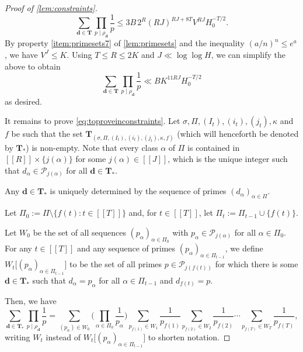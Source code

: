 \documentclass[11pt]{amsart}
\theoremstyle{definition}
\renewcommand{\leq}{\leqslant}
\newcommand{\sinterval}[1]{[\![#1]\!] }
\newcommand{\primes}{\mathcal{P}}
\renewcommand{\d}{\boldsymbol{d}}
\newcommand{\curlyL}{V}
\newcommand{\fprod}[1]{\rho_{#1}}
\newcommand{\pall}{\fprod{\d}}
\newcommand{\solpartial}{W}
\newcommand{\XX}{\mathbf{T}}
\newcommand{\repR}{J}
\newcommand{\repK}{K}
\newcommand{\newR}{\sinterval{J}}
\newcommand{\tupsize}{R}
\newcommand{\ncond}{T}
\newcommand{\cshift}{\kappa}
\newcommand{\somesigns}{\sigma}
\begin{document}
\begin{proof}[Proof of \cref{lem:constraints}]
\begin{equation*}
	\sum_{\d\in \XX} \prod_{p\mid \pall} \frac1p \leq 3B \, 2^{\tupsize} (\tupsize \repR)^{\tupsize \repR+8\ncond} \curlyL^{\tupsize \repR} H_0^{-\ncond/2}.
\end{equation*}
By property \cref{item:primesets7} of \cref{lem:primesets} and the inequality $(a/n)^n\leq e^a$, we have $\curlyL^{\repR} \leq \repK$. Using $\ncond \leq \tupsize \leq 2\repK$ and $\repR \ll \log\log H$, we can simplify the above to obtain
\begin{equation*}
	\sum_{\d\in \XX} \prod_{p\mid \pall} \frac1p \ll B \repK^{11\tupsize \repR} H_0^{-\ncond/2}
\end{equation*}
as desired.

It remains to prove \cref{eq:toproveinconstraints}. Let $\somesigns,\Pi, (I_t),(i_t),(j_t),\cshift$ and $f$ be such that the set $\XX_{(\somesigns,\Pi, (I_t),(i_t),(j_t),\cshift,f)}$ (which will henceforth be denoted by $\XX_*$) is non-empty. Note that every class $\alpha$ of $\Pi$ is contained in $\sinterval{\tupsize} \!\times\!  \{j(\alpha)\}$ for some $j(\alpha)\in \newR$, which is the unique integer such that $d_{\alpha} \in \primes_{\!j(\alpha)}$ for all $\d \in \XX_*$.

Any $\d \in\XX_*$ is uniquely determined by the sequence of primes $(d_{\alpha})_{\alpha\in \Pi}$. 

Let $\Pi_0 := \Pi\setminus \{f(t) : t\in \sinterval{\ncond}\}$ and, for $t\in \sinterval{\ncond}$, let $\Pi_t := \Pi_{t-1} \cup \{f(t)\}$. 

Let $\solpartial_0$ be the set of all sequences $(p_{\alpha})_{\alpha\in \Pi_0}$ with $p_{\alpha}\in \primes_{\!j(\alpha)}$ for all $\alpha\in \Pi_0$. For any $t\in \sinterval{\ncond}$ and any sequence of primes $(p_{\alpha})_{\alpha\in \Pi_{t-1}}$, we define $\solpartial_t\big[ (p_{\alpha})_{\alpha\in \Pi_{t-1}}\big]$ to be the set of all primes ${p\in \primes_{\!j(f(t))}}$ for which there is some $\d\in\XX_*$ such that $d_{\alpha} = p_{\alpha}$ for all $\alpha\in \Pi_{t-1}$ and $d_{f(t)} = p$. 

Then, we have
\begin{equation}
\label{eq:nestedsums}
	\sum_{\d\in\XX_*} \prod_{p\mid \pall} \frac1p =
	\sum_{(p_{\alpha})\in \solpartial_0} \bigg(\prod_{\alpha\in \Pi_0} \frac{1}{p_{\alpha}} \bigg) \sum_{p_{f(1)}\in \solpartial_1} \frac{1}{p_{f(1)}} 
	 \sum_{p_{f(2)}\in \solpartial_2} \frac{1}{p_{f(2)}} \cdots \sum_{p_{f(\ncond)}\in \solpartial_{\ncond}} \frac{1}{p_{f(\ncond)}}, 
\end{equation}
writing $\solpartial_t$ instead of $\solpartial_t\big[ (p_{\alpha})_{\alpha\in \Pi_{t-1}}\big]$ to shorten notation.


\end{proof}
\end{document}
